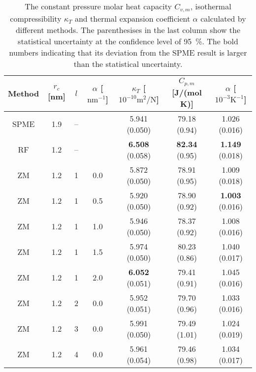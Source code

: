 \documentclass[aip,jcp,a4paper,reprint,unsortedaddress,onecolumn,fleqn]{revtex4-1}
\begin{document}
\begin{table}
  \centering
  \caption{The constant pressure molar heat capacity $C_{v,m}$, isothermal compressibility $\kappa_T$ and
    thermal expansion coefficient $\alpha$
    calculated by different methods.    
    The parenthesises in the last column show the statistical uncertainty
    at the confidence level of 95~\%.
    The bold numbers indicating that its deviation from the SPME result is larger than the statistical uncertainty.
  }
  \begin{tabular*}{0.9\textwidth}{@{\extracolsep{\fill}}cccc ccc}\hline\hline
    Method      &   $r_c$ [nm] &    $l$ & $\alpha$ [$\textrm{nm}^{-1}$]     & $\kappa_T$ [$10^{-10}\textrm{m}^2/\textrm{N}$] & $C_{p,m}$ [J/(mol K)] & $\alpha$ [$10^{-3}\textrm{K}^{-1}$]\\\hline
    SPME        &  1.9     &       -- &    & 5.941 (0.050)               &79.18 (0.94)           &1.026 (0.016)          \\
    RF          &  1.2     & --       &    & \textbf{6.508} (0.058)      &\textbf{82.34} (0.95)  &\textbf{1.149} (0.018) \\\hline
    ZM          &  1.2     &       1  & 0.0& 5.872 (0.050)               &78.91 (0.95)           &1.009 (0.018)          \\
    ZM          &  1.2     &       1  & 0.5& 5.920 (0.050)               &78.90 (0.92)           &\textbf{1.003} (0.016) \\
    ZM          &  1.2     &       1  & 1.0& 5.946 (0.050)               &78.37 (0.92)           &1.008 (0.016)          \\
    ZM          &  1.2     &       1  & 1.5& 5.974 (0.050)               &80.23 (0.86)           &1.040 (0.017)          \\
    ZM          &  1.2     &       1  & 2.0& \textbf{6.052} (0.051)      &79.41 (0.91)           &1.045 (0.016)          \\\hline
    ZM          &  1.2     &       2  & 0.0& 5.952 (0.051)               &79.70 (0.96)           &1.033 (0.016)          \\
    ZM          &  1.2     &       3  & 0.0& 5.991 (0.050)               &79.49 (1.01)           &1.024 (0.019)          \\
    ZM          &  1.2     &       4  & 0.0& 5.961 (0.054)               &79.46 (0.98)           &1.034 (0.017)          \\
    \hline\hline
  \end{tabular*}
  \label{tab:tmp3a}
\end{table}
\end{document}
